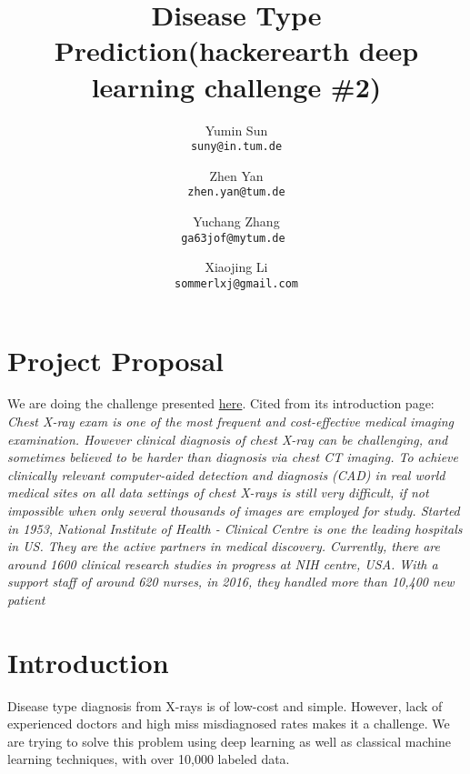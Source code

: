 \documentclass[10pt,twocolumn,letterpaper]{article}
\begin{document}
\title{Disease Type Prediction(hackerearth deep learning challenge \#2)}

\author{Yumin Sun\\
{\tt\small suny@in.tum.de}
\and
Zhen Yan\\
{\tt\small zhen.yan@tum.de}
\and
Yuchang Zhang\\
{\tt\small ga63jof@mytum.de }
\and
Xiaojing Li\\
{\tt\small sommerlxj@gmail.com}
}


\maketitle

%
%
\section*{Project Proposal}
We are doing the challenge presented \href{https://www.hackerearth.com/challenge/competitive/deep-learning-challenge-2/machine-learning/yes-a-question/}{here}. Cited from its introduction page:
\emph{Chest X-ray exam is one of the most frequent and cost-effective medical imaging examination. However clinical diagnosis of chest X-ray can be challenging, and sometimes believed to be harder than diagnosis via chest CT imaging. To achieve clinically relevant computer-aided detection and diagnosis (CAD) in real world medical sites on all data settings of chest X-rays is still very difficult, if not impossible when only several thousands of images are employed for study. Started in 1953, National Institute of Health - Clinical Centre is one the leading hospitals in US. They are the active partners in medical discovery. Currently, there are around 1600 clinical research studies in progress at NIH centre, USA. With a support staff of around 620 nurses, in 2016, they handled more than 10,400 new patient}

\section{Introduction}
	Disease type diagnosis from X-rays is of low-cost and simple. However, lack of experienced doctors and high miss misdiagnosed rates makes it a challenge. We are trying to solve this problem using deep learning as well as classical machine learning techniques, with over 10,000 labeled data.
	
\end{document}
